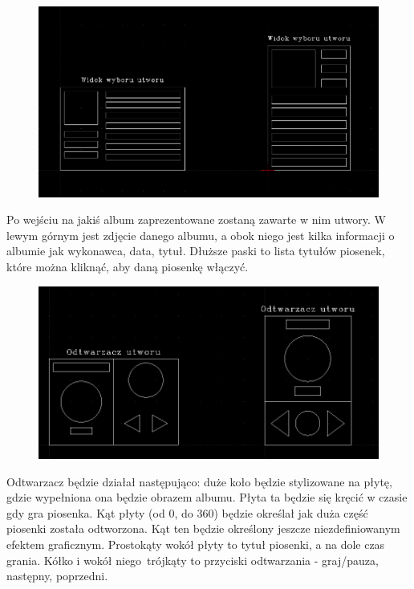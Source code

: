 \begin{figure}[H]
	\centering
	\includegraphics[width=1\textwidth]{images/mockup_utwory.png}
	\caption{}
\end{figure}

Po wejściu na jakiś album zaprezentowane zostaną zawarte w nim utwory. W lewym górnym jest zdjęcie danego albumu, a obok niego jest kilka informacji o albumie jak wykonawca, data, tytuł. Dłuższe paski to lista tytułów piosenek, które można kliknąć, aby daną piosenkę włączyć.

\begin{figure}[H]
	\centering
	\includegraphics[width=1\textwidth]{images/mockup_odtwarzacz.png}
	\caption{}
\end{figure}

Odtwarzacz będzie działał następująco: duże koło będzie stylizowane na płytę, gdzie wypełniona ona będzie obrazem albumu. Płyta ta będzie się kręcić w czasie gdy gra piosenka. Kąt płyty (od 0\degree, do 360\degree) będzie określał jak duża część piosenki została odtworzona. Kąt ten będzie określony jeszcze niezdefiniowanym efektem graficznym. Prostokąty wokół płyty to tytuł piosenki, a na dole czas grania. Kółko i wokół niego trójkąty to przyciski odtwarzania - graj/pauza, następny, poprzedni. 
